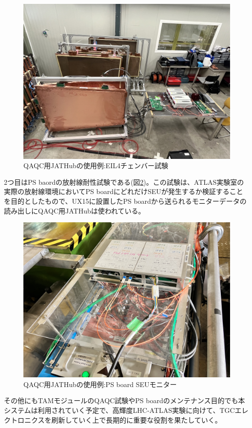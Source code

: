 \begin{figure}
\centering
\includegraphics[width=16cm]{fig/QAQC/JATHubEIL4.JPG}
\caption[QAQC用JATHubの使用例:EIL4チェンバー試験]{QAQC用JATHubの使用例:EIL4チェンバー試験\cite{mt_wada}}
\label{JATHubEIL4}
\end{figure}

2つ目はPS baordの放射線耐性試験である(図\ref{JATHubSEU})。この試験は、ATLAS実験室の実際の放射線環境においてPS boardにどれだけSEUが発生するか検証することを目的としたもので、UX15に設置したPS boardから送られるモニターデータの読み出しにQAQC用JATHubは使われている。

\begin{figure}
\centering
\includegraphics[width=16cm]{fig/QAQC/JATHubSEU.JPG}
\caption[QAQC用JATHubの使用例:PS board SEUモニター]{QAQC用JATHubの使用例:PS board SEUモニター\cite{mt_hashimoto}}
\label{JATHubSEU}
\end{figure}

その他にもTAMモジュールのQAQC試験やPS boardのメンテナンス目的でも本システムは利用されていく予定で、高輝度LHC-ATLAS実験に向けて、TGCエレクトロニクスを刷新していく上で長期的に重要な役割を果たしていく。